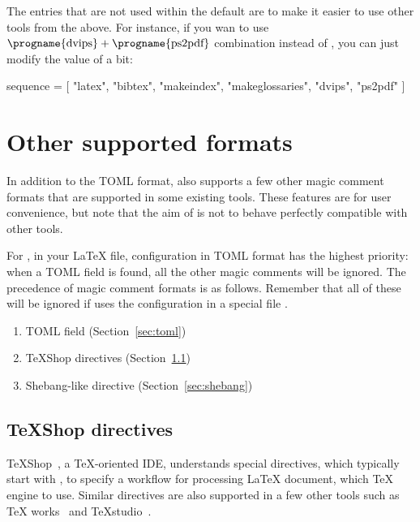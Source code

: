 \documentclass{llmk-doc}
\begin{document}
The entries that are not used within the default  are to make it
easier to use other tools from the above. For instance, if you wan to use
$\text{\progname{dvips}}+\text{\progname{ps2pdf}}$ combination instead of
, you can just modify the value of  a bit:
%
\begin{htcode}
sequence = [
  "latex", "bibtex", "makeindex", "makeglossaries", "dvips", "ps2pdf"
]
\end{htcode}

\section{Other supported formats}
\label{sec:magic-comment}

In addition to the TOML format,  also supports a few other magic
comment formats that are supported in some existing tools. These features are
for user convenience, but note that the aim of  is not to behave
perfectly compatible with other tools.

For , in your {\LaTeX} file, configuration in TOML format has the
highest priority: when a TOML field is found, all the other magic comments will
be ignored. The precedence of magic comment formats is as follows. Remember
that all of these will be ignored if  uses the configuration in a
special file .
%
\begin{enumerate}
\item TOML field (Section~\ref{sec:toml})
\item {\TeX}Shop directives (Section~\ref{sec:ts-directive})
\item Shebang-like directive (Section~\ref{sec:shebang})
\end{enumerate}

\subsection{{\TeX}Shop directives}
\label{sec:ts-directive}

{\TeX}Shop~\cite{texshop}, a {\TeX}-oriented IDE, understands special
directives, which typically start with , to
specify a workflow for processing {\LaTeX} document, \eg which {\TeX} engine to
use. Similar directives are also supported in a few other tools such as {\TeX}%
works~\cite{texworks} and {\TeX}studio~\cite{texstudio}.
\end{document}

